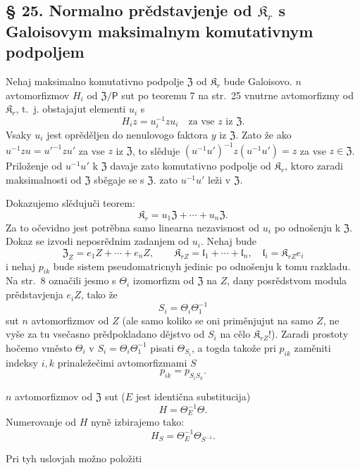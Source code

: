 \documentclass[11pt]{article}
\begin{document}
\subsection*{§ 25. Normalno prědstavjenje od \(\mathfrak K_r\) s Galoisovym maksimalnym komutativnym podpoljem\protect\footnotemark}
\label{normaldarstellung-von-r_r-mit-galoisschem-maximalem-kommutativem-teilkoerper-1}

Nehaj maksimalno komutativno podpolje \(\mathfrak Z\) od \(\mathfrak K_r\) bude Galoisovo. \(n\) avtomorfizmov \(H_i\) od \(\mathfrak Z/\mathsf P\) sut po teoremu 7 na str.~25 vnutrne avtomorfizmy od \(\mathfrak K_r\), t.~j. obstajajut elementi \(u_i\) s
\[
H_i z=u_i^{-1}zu_i\quad\text{za vse }z\text{ iz }\mathfrak Z.
\]
Vsaky \(u_i\) jest oprěděljen do nenulovogo faktora \(y\) iz \(\mathfrak Z\). Zato že ako \(u^{-1}zu=u'^{-1}zu'\) za vse \(z\) iz \(\mathfrak Z\), to slěduje \((u^{-1}u')^{-1}z(u^{-1}u')=z\) za vse \(z\in\mathfrak Z\). Priloženje od \(u^{-1}u'\) k \(\mathfrak Z\) davaje zato komutativno podpolje od \(\mathfrak K_r\), ktoro zaradi maksimalnosti od \(\mathfrak Z\) sběgaje se s \(\mathfrak Z\). zato \(u^{-1}u'\) leži v \(\mathfrak Z\).

Dokazujemo slědujuči teorem:
\[
\mathfrak K_r=u_1\mathfrak Z+\cdots+u_n\mathfrak Z.
\]
Za to očevidno jest potrěbna samo linearna nezavisnost od \(u_i\) po odnošenju k \(\mathfrak Z\). Dokaz se izvodi neposrědnim zadanjem od \(u_i\). Nehaj bude
\[
\mathfrak Z_Z=e_1Z+\cdots+e_nZ,\qquad
\mathfrak K_{rZ}=\mathfrak l_1+\cdots+\mathfrak l_n,\quad
\mathfrak l_i=\mathfrak K_{rZ}e_i
\]
i nehaj \(p_{ik}\) bude sistem pseudomatricnyh jedinic po odnošenju k tomu razkladu. Na str.~8 označili jesmo s \(\Theta_i\) izomorfizm od \(\mathfrak Z\) na \(Z\), dany posrědstvom modula prědstavjenja \(e_iZ\), tako že
\[
S_i=\Theta_i\Theta_1^{-1}
\]
sut \(n\) avtomorfizmov od \(Z\) (ale samo koliko se oni priměnjujut na samo \(Z\), ne vyše za tu vsečasno prědpokladano dějstvo od \(S_i\) na cělo \(\mathfrak K_{rZ}\)!). Zaradi prostoty hočemo vměsto \(\Theta_i\) v \(S_i=\Theta_i\Theta_1^{-1}\) pisati \(\Theta_{S_i}\), a togda takože pri \(p_{ik}\) zaměniti indeksy \(i,k\) prinaležečimi avtomorfizmami \(S\)
\[
p_{ik}=p_{S_iS_k}.
\]

\(n\) avtomorfizmov od \(\mathfrak Z\) sut (\(E\) jest identična substitucija)
\[
H=\Theta_E^{-1}\Theta.
\]
Numerovanje od \(H\) nyně izbirajemo tako:
\[
H_S=\Theta_E^{-1}\Theta_{S^{-1}}.
\]

Pri tyh uslovjah možno položiti
\end{document}
